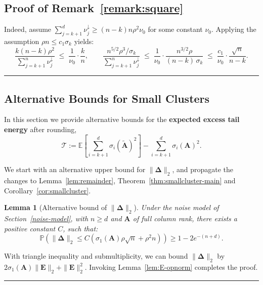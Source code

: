 \documentclass{article}
\newcommand{\twonorm}[1]{\|#1\|_2}
\newcommand{\Ex}[1]{\mbox{}\mathbb{E}\left[#1\right]}
\newcommand{\pr}[1]{\mbox{}\mathbb{P}\left(#1\right)}
\newcommand{\Ab}{\mathbf{A}}
\newcommand{\Eb}{\mathbf{E}}
\newcommand{\Abtil}{\tilde{\Ab}}
\newcommand{\Tcal}{\mathcal{T}}
\newcommand{\BlackBox}{\rule{1.5ex}{1.5ex}}  %
\newenvironment{proof}{\par\noindent{\bf Proof\ }}{\hfill\BlackBox\par\medskip}
\newtheorem{lemma}{Lemma}[section]
\newcommand{\rbr}[1]{\left(#1\right)}
\newcommand{\Deltab}{\boldsymbol{\Delta}}
\begin{document}
\subsection{Proof of Remark~\ref{remark:square}}\label{app:remark_square}

\begin{proof}
    Indeed, assume $\sum_{j=k+1}^{d}\nu_j^\downarrow \ge (n-k) n \rho^2 \nu_0$ for some constant $\nu_0$. Applying the assumption $\rho n\le c_1 \sigma_k$ yields:
\begin{equation*}
    \frac{k (n-k)\rho^2}{\sum_{j=k+1}^{n}\nu_j^\downarrow}\;\le\; \frac{1}{\nu_0}\cdot\frac{k}{n}, \qquad
    \frac{n^{5/2}\rho^3/\sigma_k}{\sum_{j=k+1}^{n}\nu_j^\downarrow}\;\le\; \frac{1}{\nu_0}\cdot\frac{n^{3/2}\rho}{(n-k)\,\sigma_k}\;\le\; \frac{c_1}{\nu_0}\cdot\frac{\sqrt n}{n-k}.
\end{equation*}
\end{proof}

\subsection{Alternative Bounds for Small Clusters} \label{sec:alter_bounds_small_cluster}
In this section we provide alternative bounds for the \textbf{expected excess tail energy} after rounding,
\begin{equation*}
    \Tcal := \Ex{\sum_{i=k+1}^{d} \sigma_i(\Abtil)^2} - \sum_{i=k+1}^{d}\sigma_i(\Ab)^2.
\end{equation*}

We start with an alternative upper bound for $\twonorm{\Deltab}$, and propagate the changes to Lemma~\ref{lem:remainder}, Theorem~\ref{thm:smallcluster-main} and Corollary~\ref{cor:smallcluster}.

\begin{lemma}[Alternative bound of $\twonorm{\Deltab}$]\label{lem:Delta-opnorm_alter}
Under the noise model of Section~\ref{noise-model}, with $n \ge d$ and $\Ab$ of full column rank, there exists a positive constant $C$, such that:
\begin{equation*}
    \pr{\twonorm{\Deltab} \le C (\sigma_1(\Ab) \rho \sqrt{n} + \rho^2 n)} \ge 1 - 2 e^{-\rbr{n+d}}.
\end{equation*}
\end{lemma}
\begin{proof}
    With triangle inequality and submultiplicity, we can bound $\twonorm{\Deltab}$ by $2 \sigma_1(\Ab) \twonorm{\Eb}+ \twonorm{\Eb}^2$. Invoking Lemma~\ref{lem:E-opnorm} completes the proof.
\end{proof}
\end{document}
